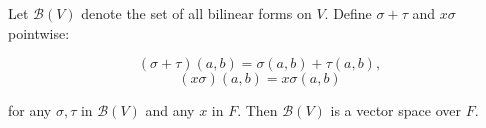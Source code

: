 Let $\mathcal{B}(V)$ denote the set of all bilinear forms on $V$. Define $\sigma + \tau$ and $x\sigma$ pointwise:

$$(\sigma + \tau)(a, b) = \sigma(a, b) + \tau(a, b),$$
$$(x\sigma)(a, b) = x\sigma(a, b)$$

for any $\sigma, \tau$ in $\mathcal{B}(V)$ and any $x$ in $F$. Then $\mathcal{B}(V)$ is a vector space over $F$.

